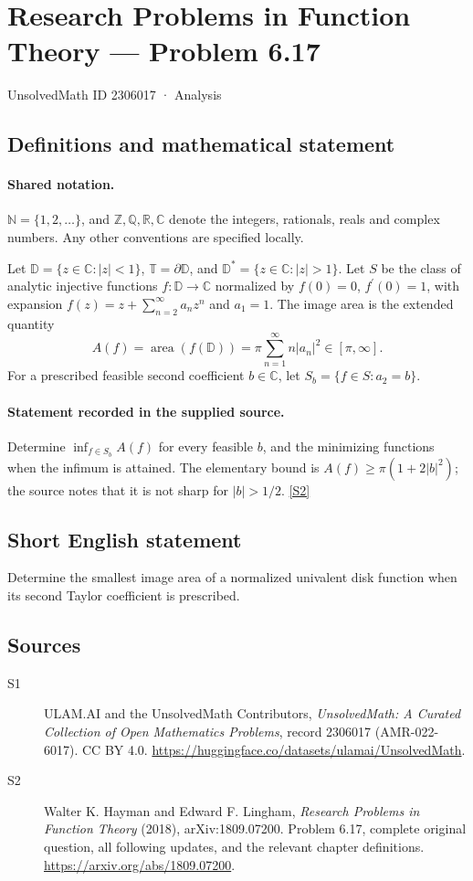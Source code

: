 \documentclass[11pt]{book}
\newcommand{\sref}[2]{\hyperlink{source:#1:#2}{[S#2]}}
\begin{document}
\setcounter{section}{2306016}
\section{Research Problems in Function Theory — Problem 6.17}\label{2306017}
{\small\sffamily UnsolvedMath ID 2306017 · Analysis}
\subsection{Definitions and mathematical statement}

\paragraph{Shared notation.}$\mathbb N=\{1,2,\ldots\}$, and $\mathbb Z,\mathbb Q,\mathbb R,\mathbb C$ denote the integers, rationals, reals and complex numbers. Any other conventions are specified locally.


Let $\mathbb D=\{z\in\mathbb C:|z|<1\}$, $\mathbb T=\partial\mathbb D$, and $\mathbb D^*=\{z\in\mathbb C:|z|>1\}$. Let $S$ be the class of analytic injective functions $f:\mathbb D\to\mathbb C$ normalized by $f(0)=0$, $f^{\prime}(0)=1$, with expansion $f(z)=z+\sum_{n=2}^{\infty}a_nz^n$ and $a_1=1$. The image area is the extended quantity \[A(f)=\operatorname{area}(f(\mathbb D))=\pi\sum_{n=1}^{\infty}n|a_n|^2\in[\pi,\infty].\] For a prescribed feasible second coefficient $b\in\mathbb C$, let $S_b=\{f\in S:a_2=b\}$.
\paragraph{Statement recorded in the supplied source.}
Determine $\inf_{f\in S_b}A(f)$ for every feasible $b$, and the minimizing functions when the infimum is attained. The elementary bound is $A(f)\ge\pi(1+2|b|^2)$; the source notes that it is not sharp for $|b|>1/2$. \sref{2306017}{2}
\subsection{Short English statement}
Determine the smallest image area of a normalized univalent disk function when its second Taylor coefficient is prescribed.
\subsection{Sources}
\begin{description}
\item[\hypertarget{source:2306017:1}{S1}] ULAM.AI and the UnsolvedMath Contributors, \emph{UnsolvedMath: A Curated Collection of Open Mathematics Problems}, record 2306017 (AMR-022-6017). CC BY 4.0. \url{https://huggingface.co/datasets/ulamai/UnsolvedMath}.
\item[\hypertarget{source:2306017:2}{S2}] Walter K. Hayman and Edward F. Lingham, \emph{Research Problems in Function Theory} (2018), arXiv:1809.07200. Problem 6.17, complete original question, all following updates, and the relevant chapter definitions. \url{https://arxiv.org/abs/1809.07200}.
\end{description}
\label{end:2306017}
\end{document}
